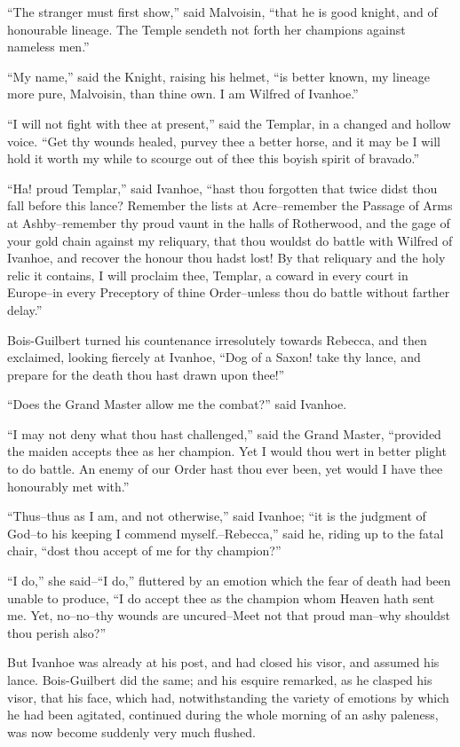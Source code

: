 ``The stranger must first show,'' said Malvoisin, ``that he is good
knight, and of honourable lineage. The Temple sendeth not forth her
champions against nameless men.''

``My name,'' said the Knight, raising his helmet, ``is better known, my
lineage more pure, Malvoisin, than thine own. I am Wilfred of Ivanhoe.''

``I will not fight with thee at present,'' said the Templar, in a
changed and hollow voice. ``Get thy wounds healed, purvey thee a better
horse, and it may be I will hold it worth my while to scourge out of
thee this boyish spirit of bravado.''

``Ha! proud Templar,'' said Ivanhoe, ``hast thou forgotten that twice
didst thou fall before this lance? Remember the lists at Acre--remember
the Passage of Arms at Ashby--remember thy proud vaunt in the halls of
Rotherwood, and the gage of your gold chain against my reliquary, that
thou wouldst do battle with Wilfred of Ivanhoe, and recover the honour
thou hadst lost! By that reliquary and the holy relic it contains, I
will proclaim thee, Templar, a coward in every court in Europe--in every
Preceptory of thine Order--unless thou do battle without farther
delay.''

Bois-Guilbert turned his countenance irresolutely towards Rebecca, and
then exclaimed, looking fiercely at Ivanhoe, ``Dog of a Saxon! take thy
lance, and prepare for the death thou hast drawn upon thee!''

``Does the Grand Master allow me the combat?'' said Ivanhoe.

``I may not deny what thou hast challenged,'' said the Grand Master,
``provided the maiden accepts thee as her champion. Yet I would thou
wert in better plight to do battle. An enemy of our Order hast thou ever
been, yet would I have thee honourably met with.''

``Thus--thus as I am, and not otherwise,'' said Ivanhoe; ``it is the
judgment of God--to his keeping I commend myself.--Rebecca,'' said he,
riding up to the fatal chair, ``dost thou accept of me for thy
champion?''

``I do,'' she said--``I do,'' fluttered by an emotion which the fear of
death had been unable to produce, ``I do accept thee as the champion
whom Heaven hath sent me. Yet, no--no--thy wounds are uncured--Meet not
that proud man--why shouldst thou perish also?''

But Ivanhoe was already at his post, and had closed his visor, and
assumed his lance. Bois-Guilbert did the same; and his esquire remarked,
as he clasped his visor, that his face, which had, notwithstanding the
variety of emotions by which he had been agitated, continued during the
whole morning of an ashy paleness, was now become suddenly very much
flushed.

